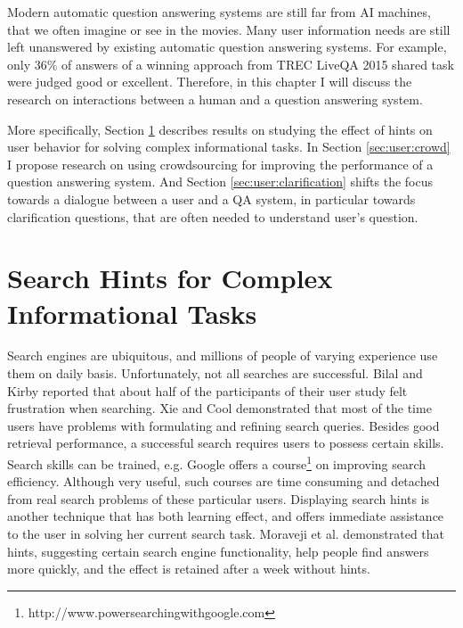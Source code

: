 %

\label{chapter:users}

\noindent

Modern automatic question answering systems are still far from AI machines, that we often imagine or see in the movies.
Many user information needs are still left unanswered by existing automatic question answering systems.
For example, only 36\% of answers of a winning approach from TREC LiveQA 2015 shared task were judged good or excellent.
Therefore, in this chapter I will discuss the research on interactions between a human and a question answering system.

More specifically, Section \ref{sec:user:hints} describes results on studying the effect of hints on user behavior for solving complex informational tasks.
In Section \ref{sec:user:crowd} I propose research on using crowdsourcing for improving the performance of a question answering system.
And Section \ref{sec:user:clarification} shifts the focus towards a dialogue between a user and a QA system, in particular towards clarification questions, that are often needed to understand user's question.

\section{Search Hints for Complex Informational Tasks}
\label{sec:user:hints}

Search engines are ubiquitous, and millions of people of varying experience use them on daily basis.
Unfortunately, not all searches are successful.
Bilal and Kirby \cite{Bilal:2002:DSI:637512.637516} reported that about half of the participants of their user study felt frustration when searching.
Xie and Cool \cite{xie2009understanding} demonstrated that most of the time users have problems with formulating and refining search queries.
Besides good retrieval performance, a successful search requires users to possess certain skills.
Search skills can be trained, e.g. Google offers a course\footnote{http://www.powersearchingwithgoogle.com} on improving search efficiency.
Although very useful, such courses are time consuming and detached from real search problems of these particular users.
Displaying search hints is another technique that has both learning effect, and offers immediate assistance to the user in solving her current search task.
Moraveji et al. \cite{Moraveji:2011:MIU:2009916.2009966} demonstrated that hints, suggesting certain search engine functionality, help people find answers more quickly, and the effect is retained after a week without hints.

